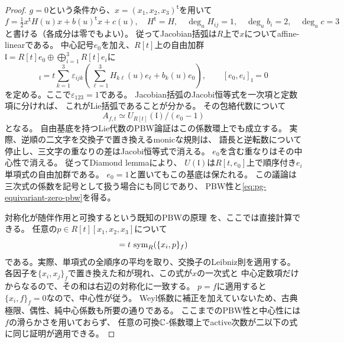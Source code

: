\begin{proof}
$g=0$という条件から、$x=(x_1,x_2,x_3)^{\mathsf t}$を用いて
\begin{equation}
 f=\tfrac12x^{\mathsf t}H(u)x+b(u)^{\mathsf t}x+c(u),
 \quad H^{\mathsf t}=H,\quad
 \deg_u H_{ij}=1,\quad \deg_u b_i=2,\quad\deg_u c=3
 \label{eq:pg-equivariant-zero-quadratic-form}
\end{equation}
と書ける（各成分は零でもよい）。
従ってJacobian括弧は$R$上で$x$についてaffine-linearである。
中心記号$e_0$を加え、$R[t]$上の自由加群
$\mathfrak l=R[t]e_0\oplus\bigoplus_{i=1}^3R[t]e_i$に
\begin{equation}
 [e_i,e_j]_{\mathfrak l}
 =t\sum_{k=1}^3\varepsilon_{ijk}
       \left(\sum_{\ell=1}^3 H_{k\ell}(u)e_\ell+b_k(u)e_0\right),
 \qquad [e_0,e_i]_{\mathfrak l}=0
 \label{eq:pg-equivariant-zero-lie-algebra}
\end{equation}
を定める。ここで$\varepsilon_{123}=1$である。
Jacobian括弧のJacobi恒等式を一次項と定数項に分ければ、
これがLie括弧であることが分かる。
その包絡代数について
\begin{equation}
 A_{f,t}\simeq U_{R[t]}(\mathfrak l)/(e_0-1)
 \label{eq:pg-equivariant-zero-enveloping}
\end{equation}
となる。
自由基底を持つLie代数のPBW論証はこの係数環上でも成立する。
実際、逆順の二文字を交換子で置き換えるmonicな規則は、
語長と逆転数について停止し、三文字の重なりの差はJacobi恒等式で消える。
$e_0$を含む重なりはその中心性で消える。
従ってDiamond lemma\cite[Theorem~1.2]{BergNE12}により、
$U(\mathfrak l)$は$R[t,e_0]$上で順序付き$e_i$単項式の自由加群である。
$e_0=1$と置いてもこの基底は保たれる。
この議論は三次式の係数を記号として扱う場合にも同じであり、
PBW性と\eqref{eq:pg-equivariant-zero-pbw}を得る。

対称化が随伴作用と可換するという既知のPBWの原理
\cite[Corollaries~13.7--13.8, p.~75]{PEtingofLie}を、ここでは直接計算できる。
任意の$p\in R[t][x_1,x_2,x_3]$について
\begin{equation}
 [x_i,\sym_R(p)]=t\,\sym_R(\{x_i,p\}_f)
 \label{eq:pg-equivariant-zero-exact-commutator}
\end{equation}
である。実際、単項式の全順序の平均を取り、交換子のLeibniz則を適用する。
各因子を$\{x_i,x_j\}_f$で置き換えた和が現れ、この式が$x$の一次式と
中心定数項だけからなるので、その和は右辺の対称化に一致する。
$p=f$に適用すると$\{x_i,f\}_f=0$なので、中心性が従う。
Weyl係数に補正を加えていないため、古典極限、偶性、純中心係数も所要の通りである。
ここまでのPBW性と中心性には$f$の滑らかさを用いておらず、
任意の可換$\mathbb C$-係数環上でactive次数が二以下の式に同じ証明が適用できる。


\end{proof}
